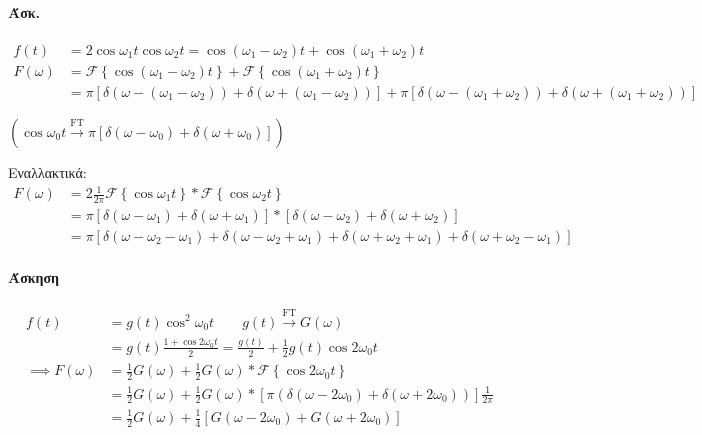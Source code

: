 \documentclass[11pt,a4paper,titlepage,fleqn]{article}
\begin{document}
     \paragraph{Άσκ.}
     \begin{align*}
     f(t) &= 2\cos\omega_1 t \cos\omega_2 t = \cos(\omega_1-\omega_2)t
     +\cos(\omega_1+\omega_2)t
     \\ F(\omega ) &= \mathscr F\left\lbrace 
     \cos(\omega_1-\omega_2)t
      \right\rbrace + \mathscr F \left\lbrace \cos(\omega_1+\omega_2)t \right\rbrace
      \\ &=
      \pi \left[
      \delta\left( \omega -(\omega_1-\omega_2) \right)
      +\delta\left( \omega +(\omega_1-\omega_2) \right)
      \right] + \pi \left[
      \delta\left( \omega -(\omega_1+\omega_2) \right)
      +\delta\left( \omega +(\omega_1+\omega_2) \right)
      \right] 
     \end{align*}
     
     \( \left( \cos\omega_0t \xrightarrow{\text{FT}}
     \pi\left[ \delta(\omega -\omega_0)+\delta(\omega+\omega_0) \right]
      \right) \)
     
     Εναλλακτικά:
     \begin{align*}
     F(\omega ) &= 2\frac{1}{2\pi}\mathscr F \left\lbrace \cos\omega_1 t \right\rbrace
     * \mathscr F\left\lbrace \cos\omega_2 t \right\rbrace \\
     &= \pi \left[ \delta(\omega -\omega_1)+\delta(\omega+\omega_1) \right]
     * \left[ \delta(\omega -\omega_2)+\delta(\omega+\omega_2) \right]
     \\ &= \pi \left[
     \delta(\omega-\omega_2-\omega_1) +\delta(\omega-\omega_2+\omega_1)
     +\delta(\omega+\omega_2+\omega_1)+\delta(\omega+\omega_2-\omega_1)
     \right]
     \end{align*}
     
     \paragraph{Άσκηση}
     \begin{align*}
     f(t) &= g(t) \cos^2 \omega_0 t \qquad g(t) \xrightarrow{\text{FT}} G(\omega )
     \\ &= g(t)\frac{1+\cos2\omega_0 t}{2} = \frac{g(t)}{2} + 
     \frac{1}{2}g(t)\cos2\omega_0 t \\
     \implies F(\omega ) &= \frac{1}{2}G(\omega )+\frac{1}{2}G(\omega )
     *\mathscr F\left\lbrace \cos2\omega_0 t \right\rbrace
     \\ &= \frac{1}{2}G(\omega )+\frac{1}{2}G(\omega ) *
     \left[ \pi\left(\delta(\omega-2\omega_0)+\delta(\omega+2\omega_0)\right) \right]
     \frac{1}{2\pi} \\ &= \frac{1}{2}G(\omega ) + \frac{1}{4} \left[
     G(\omega -2\omega_0)+G(\omega +2\omega_0)
     \right]
     \end{align*}
     
\end{document}
